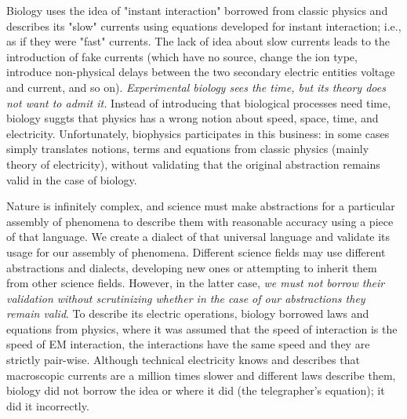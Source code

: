 Biology uses the idea of "instant interaction" borrowed from classic
physics and describes its "slow" currents using equations developed
for instant interaction; i.e., as if they were "fast" currents.
The lack of idea about slow currents leads
to the introduction of fake currents (which have no source, change
the ion type, introduce non-physical delays between the two secondary
electric entities voltage and current, and so on). \textit{Experimental
biology sees the time, but its theory does not want to admit it.}
Instead of introducing that biological processes need time, biology
suggts that physics has a wrong notion about speed, space, time,
and electricity. Unfortunately, biophysics participates in this business:
in some cases simply translates notions, terms and equations from
classic physics (mainly theory of electricity), without validating
that the original abstraction remains valid in the case of biology.




Nature is infinitely complex, and science must make
abstractions for a particular assembly of phenomena to describe them
with reasonable accuracy using a piece of that language. We create
a dialect of that universal language and validate its usage for our
assembly of phenomena. Different science fields may use different
abstractions and dialects, developing new ones or attempting to inherit
them from other science fields. However, in the latter case, \textit{we
must not borrow their validation without scrutinizing whether in the case of our
abstractions they remain valid}. To describe its electric operations,
biology borrowed laws and equations from physics, where it was assumed
that the speed of interaction is the speed of 
EM
interaction,
the interactions have the same speed and they are strictly pair-wise.
Although technical electricity knows and describes that macroscopic
currents are a million times slower and different laws describe them,
biology did not borrow the idea or where it did (the telegrapher's
equation); it did it incorrectly.

